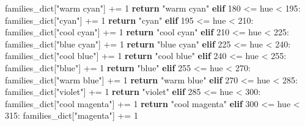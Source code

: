 \documentclass[11pt]{article}
\newenvironment{Shaded}{}{}
\newcommand{\DecValTok}[1]{\textcolor[rgb]{0.25,0.63,0.44}{{#1}}}
\newcommand{\StringTok}[1]{\textcolor[rgb]{0.25,0.44,0.63}{{#1}}}
\newcommand{\NormalTok}[1]{{#1}}
\newcommand{\ControlFlowTok}[1]{\textcolor[rgb]{0.00,0.44,0.13}{\textbf{{#1}}}}
\newcommand{\OperatorTok}[1]{\textcolor[rgb]{0.40,0.40,0.40}{{#1}}}
\begin{document}
\begin{Shaded}
\begin{Highlighting}[]
\NormalTok{            families_dict[}\StringTok{"warm cyan"}\NormalTok{] }\OperatorTok{+=} \DecValTok{1}
            \ControlFlowTok{return} \StringTok{"warm cyan"}
        \ControlFlowTok{elif} \DecValTok{180} \OperatorTok{<=}\NormalTok{ hue }\OperatorTok{<} \DecValTok{195}\NormalTok{:}
\NormalTok{            families_dict[}\StringTok{"cyan"}\NormalTok{] }\OperatorTok{+=} \DecValTok{1}
            \ControlFlowTok{return} \StringTok{"cyan"}
        \ControlFlowTok{elif} \DecValTok{195} \OperatorTok{<=}\NormalTok{ hue }\OperatorTok{<} \DecValTok{210}\NormalTok{:}
\NormalTok{            families_dict[}\StringTok{"cool cyan"}\NormalTok{] }\OperatorTok{+=} \DecValTok{1}
            \ControlFlowTok{return} \StringTok{"cool cyan"}
        \ControlFlowTok{elif} \DecValTok{210} \OperatorTok{<=}\NormalTok{ hue }\OperatorTok{<} \DecValTok{225}\NormalTok{:}
\NormalTok{            families_dict[}\StringTok{"blue cyan"}\NormalTok{] }\OperatorTok{+=} \DecValTok{1}
            \ControlFlowTok{return} \StringTok{"blue cyan"}
        \ControlFlowTok{elif} \DecValTok{225} \OperatorTok{<=}\NormalTok{ hue }\OperatorTok{<} \DecValTok{240}\NormalTok{:}
\NormalTok{            families_dict[}\StringTok{"cool blue"}\NormalTok{] }\OperatorTok{+=} \DecValTok{1}
            \ControlFlowTok{return} \StringTok{"cool blue"}
        \ControlFlowTok{elif} \DecValTok{240} \OperatorTok{<=}\NormalTok{ hue }\OperatorTok{<} \DecValTok{255}\NormalTok{:}
\NormalTok{            families_dict[}\StringTok{"blue"}\NormalTok{] }\OperatorTok{+=} \DecValTok{1}
            \ControlFlowTok{return} \StringTok{"blue"}
        \ControlFlowTok{elif} \DecValTok{255} \OperatorTok{<=}\NormalTok{ hue }\OperatorTok{<} \DecValTok{270}\NormalTok{:}
\NormalTok{            families_dict[}\StringTok{"warm blue"}\NormalTok{] }\OperatorTok{+=} \DecValTok{1}
            \ControlFlowTok{return} \StringTok{"warm blue"}
        \ControlFlowTok{elif} \DecValTok{270} \OperatorTok{<=}\NormalTok{ hue }\OperatorTok{<} \DecValTok{285}\NormalTok{:}
\NormalTok{            families_dict[}\StringTok{"violet"}\NormalTok{] }\OperatorTok{+=} \DecValTok{1}
            \ControlFlowTok{return} \StringTok{"violet"}
        \ControlFlowTok{elif} \DecValTok{285} \OperatorTok{<=}\NormalTok{ hue }\OperatorTok{<} \DecValTok{300}\NormalTok{:}
\NormalTok{            families_dict[}\StringTok{"cool magenta"}\NormalTok{] }\OperatorTok{+=} \DecValTok{1}
            \ControlFlowTok{return} \StringTok{"cool magenta"}
        \ControlFlowTok{elif} \DecValTok{300} \OperatorTok{<=}\NormalTok{ hue }\OperatorTok{<} \DecValTok{315}\NormalTok{:}
\NormalTok{            families_dict[}\StringTok{"magenta"}\NormalTok{] }\OperatorTok{+=} \DecValTok{1}

\end{Highlighting}
\end{Shaded}
\end{document}
